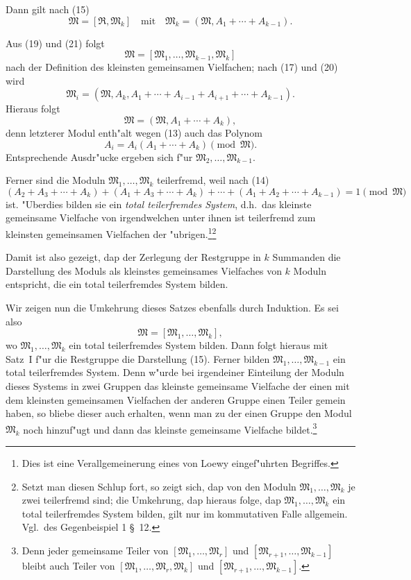 \documentclass[12pt,a4paper]{article}
\begin{document}
Dann gilt nach (15)
\begin{equation}
\mathfrak{M} = [\mathfrak{R}, \mathfrak{M}_k] \quad \text{mit} \quad \mathfrak{M}_k = (\mathfrak{M}, A_1 + \cdots + A_{k-1}). \tag{21}
\end{equation}

Aus (19) und (21) folgt
\[
\mathfrak{M} = [\mathfrak{M}_1, \ldots, \mathfrak{M}_{k-1}, \mathfrak{M}_k]
\]
nach der Definition des kleinsten gemeinsamen Vielfachen; nach (17) und (20) wird
\[
\mathfrak{M}_i = (\mathfrak{M}, A_k, A_1 + \cdots + A_{i-1} + A_{i+1} + \cdots + A_{k-1}).
\]
Hieraus folgt
\[
\mathfrak{M} = (\mathfrak{M}, A_1 + \cdots + A_k),
\]
denn letzterer Modul enth"alt wegen (13) auch das Polynom
\[
A_i = A_i(A_1 + \cdots + A_k) \pmod{\mathfrak{M}}.
\]
Entsprechende Ausdr"ucke ergeben sich f"ur $\mathfrak{M}_2,\ldots,\mathfrak{M}_{k-1}$.

Ferner sind die Moduln $\mathfrak{M}_1,\ldots,\mathfrak{M}_k$ teilerfremd, weil nach (14)
\[
(A_2 + A_3 + \cdots + A_k) + (A_1 + A_3 + \cdots + A_k) + \cdots + (A_1 + A_2 + \cdots + A_{k-1}) = 1 \pmod{\mathfrak{M}}
\]
ist. "Uberdies bilden sie ein \emph{total teilerfremdes System}, d.h.\ das kleinste gemeinsame Vielfache von irgendwelchen unter ihnen ist teilerfremd zum kleinsten gemeinsamen Vielfachen der "ubrigen.\footnote{Dies ist eine Verallgemeinerung eines von Loewy eingef"uhrten Begriffes.}\footnote{Setzt man diesen Schlup fort, so zeigt sich, dap von den Moduln $\mathfrak{M}_1,\ldots,\mathfrak{M}_k$ je zwei teilerfremd sind; die Umkehrung, dap hieraus folge, dap $\mathfrak{M}_1,\ldots,\mathfrak{M}_k$ ein total teilerfremdes System bilden, gilt nur im kommutativen Falle allgemein. Vgl.\ des Gegenbeispiel 1 \S\ 12.}

Damit ist also gezeigt, dap der Zerlegung der Restgruppe in $k$ Summanden die Darstellung des Moduls als kleinstes gemeinsames Vielfaches von $k$ Moduln entspricht, die ein total teilerfremdes System bilden.

Wir zeigen nun die Umkehrung dieses Satzes ebenfalls durch Induktion. Es sei also
\[
\mathfrak{M} = [\mathfrak{M}_1, \ldots, \mathfrak{M}_k],
\]
wo $\mathfrak{M}_1,\ldots,\mathfrak{M}_k$ ein total teilerfremdes System bilden. Dann folgt hieraus mit Satz~I f"ur die Restgruppe die Darstellung (15). Ferner bilden $\mathfrak{M}_1,\ldots,\mathfrak{M}_{k-1}$ ein total teilerfremdes System. Denn w"urde bei irgendeiner Einteilung der Moduln dieses Systems in zwei Gruppen das kleinste gemeinsame Vielfache der einen mit dem kleinsten gemeinsamen Vielfachen der anderen Gruppe einen Teiler gemein haben, so bliebe dieser auch erhalten, wenn man zu der einen Gruppe den Modul $\mathfrak{M}_k$ noch hinzuf"ugt und dann das kleinste gemeinsame Vielfache bildet.\footnote{Denn jeder gemeinsame Teiler von $[\mathfrak{M}_1,\ldots,\mathfrak{M}_r]$ und $[\mathfrak{M}_{r+1},\ldots,\mathfrak{M}_{k-1}]$ bleibt auch Teiler von $[\mathfrak{M}_1,\ldots,\mathfrak{M}_r,\mathfrak{M}_k]$ und $[\mathfrak{M}_{r+1},\ldots,\mathfrak{M}_{k-1}]$.}
\end{document}
